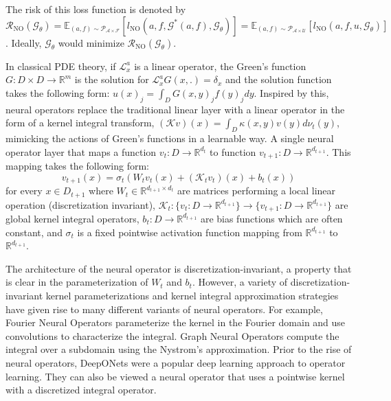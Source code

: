 \documentclass{article} %
\begin{document}
The risk of this loss function is denoted by $\mathcal{R}_{\text{NO}}(\mathcal{G}_{\theta}) = \mathbb{E}_{(a, f) \sim  \mathcal{P}_{\mathcal{A} \times \mathcal{F}}}\left[l_{\text{NO}}(a, f, \mathcal{G}^{*}(a, f), \mathcal{G}_{\theta})\right] = \mathbb{E}_{(a, f) \sim  \mathcal{P}_{\mathcal{A} \times \mathcal{U}}}\left[l_{\text{NO}}(a, f, u, \mathcal{G}_{\theta})\right]$. Ideally, $\mathcal{G}_{\theta}$ would minimize $\mathcal{R}_{\text{NO}}(\mathcal{G}_{\theta})$.

In classical PDE theory, if $\mathcal{L}_{x}^a$ is a linear operator, the Green's function \citep{stakgold2011greens} $G: D \times D \to \mathbb{R}^m$ is the solution for $\mathcal{L}_{x}^aG(x, .) = \delta_x$ and the solution function takes the following form: $u(x)_j =\int_D G(x, y)_j f(y)_jdy$. Inspired by this, neural operators \citep{kovachki2023neural} replace the traditional linear layer with a linear operator in the form of a kernel integral transform, $(\mathcal{K}v)(x) = \int_{D}\kappa(x, y)v(y)d\nu_t(y)$, mimicking the actions of Green's functions in a learnable way.  A single neural operator layer that maps a function $v_t: D \to \mathbb{R}^{d_t}$ to function $v_{t + 1}: D \to \mathbb{R}^{d_{t + 1}}$. This mapping takes the following form: $$v_{t + 1}(x) = \sigma_t\left(W_tv_t(x) + (\mathcal{K}_tv_t)(x) + b_t(x)\right)$$ for every $x \in D_{t + 1}$ where $W_t \in \mathbb{R}^{d_{t + 1} \times d_{t}}$ are matrices performing a local linear operation (discretization invariant), $\mathcal{K}_t: \{v_t: D \to \mathbb{R}^{d_{t + 1}}\} \to \{v_{t + 1}: D \to \mathbb{R}^{d_{t + 1}}\}$ are global kernel integral operators, $b_t: D \to \mathbb{R}^{d_{t + 1}}$ are bias functions which are often constant, and $\sigma_t$ is a fixed pointwise activation function mapping from $\mathbb{R}^{d_{t + 1}}$ to $\mathbb{R}^{d_{t + 1}}$.


The architecture of the neural operator is discretization-invariant, a property that is clear in the parameterization of $W_t$ and $b_t$. However, a variety of discretization-invariant kernel parameterizations and kernel integral approximation strategies have given rise to many different variants of neural operators.  
For example, Fourier Neural Operators \citep{li2020fourier} parameterize the kernel in the Fourier domain and use convolutions to characterize the integral. Graph Neural Operators \citep{li2020multipole} compute the integral over a subdomain using the Nystrom's approximation. Prior to the rise of neural operators, DeepONets \citep{lu2021learning} were a popular deep learning approach to operator learning. They can also be viewed a neural operator that uses a pointwise kernel with a discretized integral operator. 
\end{document}
